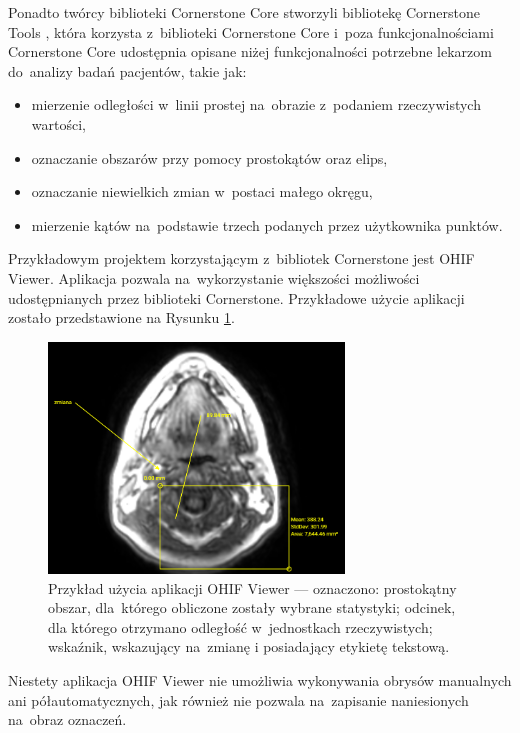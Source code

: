 \documentclass[a4paper,11pt,twoside,openright]{report}
\theoremstyle{definition}
\begin{document}
Ponadto twórcy biblioteki Cornerstone Core stworzyli bibliotekę Cornerstone Tools \cite{Cornerstone Tools},
która korzysta z~biblioteki Cornerstone Core i~poza funkcjonalnościami
Cornerstone Core udostępnia opisane niżej funkcjonalności
potrzebne lekarzom do~analizy badań pacjentów, takie jak:

\begin{itemize}[noitemsep]
\item mierzenie odległości w~linii prostej na~obrazie z~podaniem rzeczywistych wartości,
\item oznaczanie obszarów przy pomocy prostokątów oraz elips,
\item oznaczanie niewielkich zmian w~postaci małego okręgu,
\item mierzenie kątów na~podstawie trzech podanych przez użytkownika punktów.
\end{itemize}

Przykładowym projektem korzystającym z~bibliotek Cornerstone jest OHIF Viewer.
Aplikacja pozwala na~wykorzystanie większości możliwości udostępnianych przez
biblioteki Cornerstone. Przykładowe użycie aplikacji zostało przedstawione na
Rysunku \ref{fig:OHIF-example}.

\begin{figure}[b!]
	\center
	\includegraphics[width=0.7\textwidth]{OHIF-example}
	\caption{Przykład użycia aplikacji OHIF Viewer --- oznaczono: prostokątny obszar,
	dla~którego obliczone zostały wybrane statystyki; odcinek, dla którego otrzymano
	odległość w~jednostkach rzeczywistych; wskaźnik, wskazujący na~zmianę i posiadający
	etykietę tekstową.}
    	\label{fig:OHIF-example}
\end{figure}

Niestety aplikacja OHIF Viewer nie umożliwia wykonywania obrysów manualnych ani półautomatycznych,
jak również nie pozwala na~zapisanie naniesionych na~obraz oznaczeń.
\end{document}
